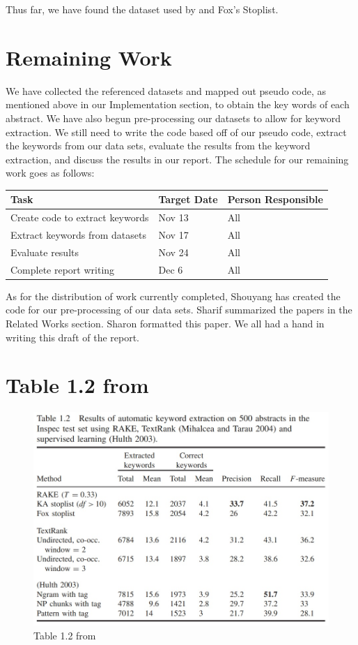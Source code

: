 \documentclass[11pt,a4paper]{article}
\begin{document}
Thus far, we have found the dataset used by \citet{hulth-2003-improved} and Fox's Stoplist.

\section{Remaining Work}

We have collected the referenced datasets and mapped out pseudo code, as mentioned above in our Implementation section, to obtain the key words of each abstract. We have also begun pre-processing our datasets to allow for keyword extraction. We still need to write the code based off of our pseudo code, extract the keywords from our data sets, evaluate the results from the keyword extraction, and discuss the results in our report. The schedule for our remaining work goes as follows:

\begin{table}[h]
\begin{center}
\begin{tabular}{|p{3.3cm}|p{1.4cm}|p{1.7cm}|}
\hline \bf Task & \bf Target Date & \bf Person  Responsible \\  
\hline
 Create code to extract keywords & Nov 13 & All \\ 
\hline 
 Extract keywords from datasets & Nov 17 & All \\
\hline
 Evaluate results & Nov 24 & All \\
\hline
Complete report writing & Dec 6 & All  \\
\hline   
\end{tabular}
\end{center}
\end{table}

As for the distribution of work currently completed, Shouyang has created the code for our pre-processing of our data sets. Sharif summarized the papers in the Related Works section. Sharon formatted this paper. We all had a hand in writing this draft of the report. 

%
%



\appendix

\section{Table 1.2 from \citet{1}}
\begin{figure}[b!]
  \centering
  \includegraphics[width=\linewidth]{table1-2.jpg}
  \caption{Table 1.2 from \citet{1}}
\end{figure}
\end{document}
